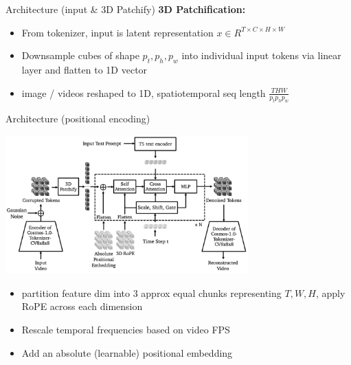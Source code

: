 \documentclass{beamer}
\begin{document}
\begin{frame}[t]{Architecture (input \& 3D Patchify)}
    \textbf{3D Patchification:}
    \begin{itemize}[label=-]
        \item From tokenizer, input is latent representation $x \in R^{T \times C \times H \times W}$ 
        \item Downsample cubes of shape $p_t, p_h, p_w$ into individual input tokens via linear layer and flatten to 1D vector
        \item image / videos reshaped to 1D, spatiotemporal seq length $\frac{T H W}{p_t p_h p_w}$
    \end{itemize}
\end{frame}

\begin{frame}[t]{Architecture (positional encoding)}
    \vspace{-1.6em}
    \begin{center}
        \includegraphics[width=0.7\textwidth]{./img/diffusion_arch.png}
    \end{center}
    \begin{itemize}[label=-]
        \item partition feature dim into 3 approx equal chunks representing $T, W, H$, apply RoPE across each dimension
        \item Rescale temporal frequencies based on video FPS
        \item Add an absolute (learnable) positional embedding %
   \end{itemize}
\end{frame}
\end{document}
